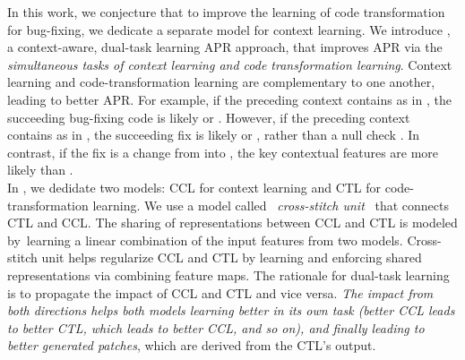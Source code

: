 In this work, we conjecture that to improve the learning of code
transformation for bug-fixing, we dedicate a separate model for
context learning. We introduce {\tool}, a context-aware, dual-task
learning APR approach, that improves APR via the {\em simultaneous
  tasks of context learning and code transformation learning}.
Context learning and code-transformation learning are complementary to
one another, leading to better APR. For example, if the
preceding context contains  as in , the succeeding bug-fixing code is likely  \code{!=}  or  \code{==}
. However, if the preceding context contains 
as in  \code{=} , the
succeeding fix is likely  \code{!=}  or
 \code{==} , rather than a null check  \code{!=} . In contrast, if the fix is a change from
 \code{==}  into  \code{!=}
, the key contextual features are more likely
 than .\\
\indent In {\tool}, we dedidate two models: CCL for context learning and CTL
for code-transformation learning. We use a model called~{\em
  cross-stitch unit}~\cite{misra2016cross} that connects CTL and
CCL. The sharing of representations between CCL and CTL is modeled
by~learning a linear combination of the input features from two
models. Cross-stitch unit helps regularize CCL and CTL by learning and
enforcing shared representations via combining feature maps. The
rationale for dual-task learning is to propagate the impact of CCL and
CTL and vice versa. {\em The impact from both directions helps both
  models learning better in its own task (better CCL leads to better
  CTL, which leads to better CCL, and so on), and finally leading to
  better generated patches}, which are derived from the CTL's output.


